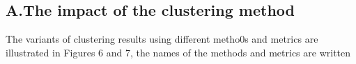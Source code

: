 \documentclass[8pt, a4paper]{article} %
\begin{document}
\begin{multicols}{2}
\fontsize{10}{14}
\selectfont
\section*{\textbf{A.The impact of the clustering method}}

\fontsize{10}{14}
\selectfont 
\quad
The variants of clustering results using different metho0s and metrics are illustrated in Figures 6 and 7, the names of the methods and metrics are written


\end{multicols}
\end{document}
